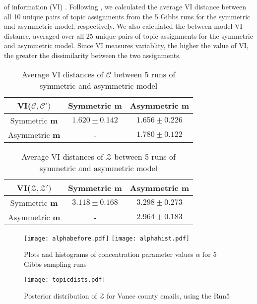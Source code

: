 \documentclass[a4paper]{article}
\begin{document}
of information (VI) \citep{meilua2003comparing}. Following \cite{wallach2009rethinking}, we calculated
the average VI distance between all 10 unique pairs of topic assignments from the 5 Gibbs runs for the symmetric and asymmetric model, respectively. We also calculated the between-model
VI distance, averaged over all 25 unique pairs of topic assignments for the symmetric and asymmetric model. Since VI measures variablity, the higher the value of VI, the greater the dissimilarity between the two assignments.\\
\footnotesize
\begin{table}[ht]
	\centering
	\begin{tabular}{|c|c|c|} 
		\hline
		\textbf{VI($\mathcal{C}, \mathcal{C'})$}& Symmetric \textbf{$\boldsymbol{m}$} &Asymmetric \textbf{ $\boldsymbol{m}$} \\
		\hline
		Symmetric \textbf{$\boldsymbol{m}$} &  $1.620\pm 0.142$&  $1.656\pm 0.226$\\
		\hline
		Asymmetric \textbf{$\boldsymbol{m}$} & - & $1.780\pm 0.122$\\
		\hline
	\end{tabular}
	\caption {Average VI distances of $\mathcal{C}$ between 5 runs of symmetric and asymmetric model }
	\label{table:VIforC}
\end{table}
\begin{table}[ht]
	\centering
	\begin{tabular}{|c|c|c|} 
		\hline
		 \textbf{VI($\mathcal{Z}, \mathcal{Z'})$}& Symmetric \textbf{$\boldsymbol{m}$} &Asymmetric \textbf{ $\boldsymbol{m}$} \\
		\hline
		Symmetric \textbf{$\boldsymbol{m}$} &  $3.118\pm 0.168$&  $3.298\pm 0.273$\\
		\hline
		Asymmetric \textbf{$\boldsymbol{m}$} & - & $2.964 \pm 0.183$\\
		\hline
	\end{tabular}
	\caption {Average VI distances of $\mathcal{Z}$ between 5 runs of symmetric and asymmetric model}
	\label{table:VIforZ}
\end{table}
\normalsize
\begin{figure}[ht]
	\centering
	\texttt{[image: alphabefore.pdf]} 
	\texttt{[image: alphahist.pdf]} 
	\caption{Plots and histograms of concentration parameter values $\alpha$ for 5 Gibbs sampling runs}
	\label{fig:alpha}
\end{figure}
\footnotesize
\begin{figure}[ht]
	\centering
	\texttt{[image: topicdists.pdf]} 
	\caption{Posterior distribution of  $\mathcal{Z}$ for Vance county emails, using the Run5}
	\label{fig:topicsymasym}
\end{figure}
\end{document}
